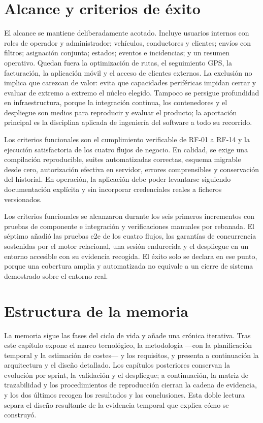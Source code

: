\section{Alcance y criterios de éxito}

El alcance se mantiene deliberadamente acotado. Incluye usuarios internos con roles de operador y administrador; vehículos, conductores y clientes; envíos con filtros; asignación conjunta; estados; eventos e incidencias; y un resumen operativo. Quedan fuera la optimización de rutas, el seguimiento GPS, la facturación, la aplicación móvil y el acceso de clientes externos. La exclusión no implica que carezcan de valor: evita que capacidades periféricas impidan cerrar y evaluar de extremo a extremo el núcleo elegido. Tampoco se persigue profundidad en infraestructura, porque la integración continua, los contenedores y el despliegue son medios para reproducir y evaluar el producto; la aportación principal es la disciplina aplicada de ingeniería del software a todo su recorrido.

Los criterios funcionales son el cumplimiento verificable de RF-01 a RF-14 y la ejecución satisfactoria de los cuatro flujos de negocio. En calidad, se exige una compilación reproducible, suites automatizadas correctas, esquema migrable desde cero, autorización efectiva en servidor, errores comprensibles y conservación del historial. En operación, la aplicación debe poder levantarse siguiendo documentación explícita y sin incorporar credenciales reales a ficheros versionados.

Los criterios funcionales se alcanzaron durante los seis primeros incrementos con pruebas de componente e integración y verificaciones manuales por rebanada. El séptimo añadió las pruebas \gls{e2e} de los cuatro flujos, las garantías de concurrencia sostenidas por el motor relacional, una sesión endurecida y el despliegue en un entorno accesible con su evidencia recogida. El éxito solo se declara en ese punto, porque una cobertura amplia y automatizada no equivale a un cierre de sistema demostrado sobre el entorno real.

\section{Estructura de la memoria}

La memoria sigue las fases del ciclo de vida y añade una crónica iterativa. Tras este capítulo expone el marco tecnológico, la metodología ---con la planificación temporal y la estimación de costes--- y los requisitos, y presenta a continuación la arquitectura y el diseño detallado. Los capítulos posteriores conservan la evolución por sprint, la validación y el despliegue; a continuación, la matriz de trazabilidad y los procedimientos de reproducción cierran la cadena de evidencia, y los dos últimos recogen los resultados y las conclusiones. Esta doble lectura separa el diseño resultante de la evidencia temporal que explica cómo se construyó.
